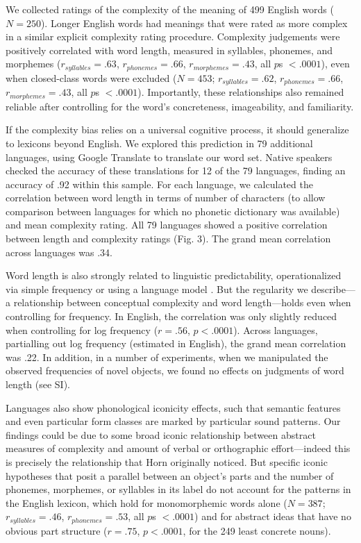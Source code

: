 \documentclass[12pt]{article}
\begin{document}
We collected ratings of the complexity of the meaning of 499 English words ($N = 250$). Longer English words had meanings that were rated as more complex in a similar explicit complexity rating procedure. Complexity judgements were positively correlated with word length, measured in syllables, phonemes, and morphemes ($r_{syllables} = .63$, $r_{phonemes} = .66$, $r_{morphemes} = .43$, all $p$s $< .0001$), even when closed-class words were excluded ($N = 453$; $r_{syllables} = .62$, $r_{phonemes} = .66$, $r_{morphemes} = .43$, all $p$s $< .0001$). Importantly, these relationships also remained reliable after controlling for the word's concreteness, imageability, and familiarity. 
						
If the complexity bias relies on a universal cognitive process, it should generalize to lexicons beyond English. We explored this prediction in 79 additional languages, using Google Translate to translate our word set. Native speakers checked the accuracy of these translations for 12 of the 79 languages, finding an accuracy of .92 within this sample. For each language, we calculated the correlation between word length in terms of number of characters (to allow comparison between languages for which no phonetic dictionary was available) and mean complexity rating. All 79 languages showed a positive correlation between length and complexity ratings (Fig. 3). The grand mean correlation across languages was .34. 
					
Word length is also strongly related to linguistic predictability, operationalized via simple frequency \cite{zipf1936} or using a language model \cite{piantadosi2011a}. But the regularity we describe---a relationship between conceptual complexity and word length---holds even when controlling for frequency. In English, the correlation was only slightly reduced when controlling for log frequency ($r = .56$, $p < .0001$). Across languages, partialling out log frequency (estimated in English), the grand mean correlation was .22. In addition, in a number of experiments, when we manipulated the observed frequencies of novel objects, we found no effects on judgments of word length (see SI). 

Languages also show phonological iconicity effects, such that semantic features \cite{maurer2006shape,westbury2005implicit} and even particular form classes \cite{farmer2006phonological} are marked by particular sound patterns. Our findings could be due to some broad iconic relationship between abstract measures of complexity and amount of verbal or orthographic effort---indeed this is precisely the relationship that Horn originally noticed. But specific iconic hypotheses that posit a parallel between an object's parts and the number of phonemes, morphemes, or syllables in its label do not account for the patterns in the English lexicon, which hold for monomorphemic words alone ($N = 387$; $r_{syllables} = .46$, $r_{phonemes} = .53$, all $p$s $< .0001$) and for abstract ideas that have no obvious part structure ($r = .75$, $p< .0001$, for the 249 least concrete nouns). 
\end{document}
